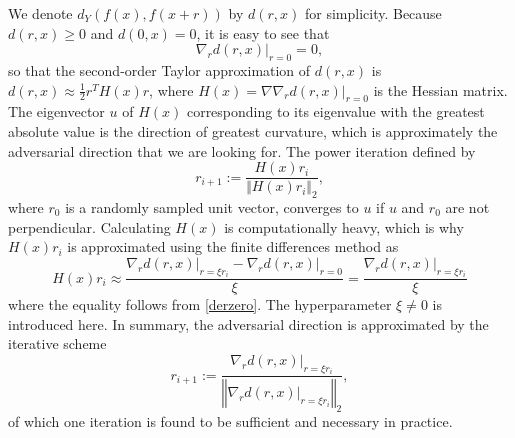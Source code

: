 \documentclass{article}
\begin{document}
We denote $d_Y(f(x),f(x+r))$ by $d(r,x)$ for simplicity. Because $d(r,x)\geq 0$ and $d(0,x)=0$, it is easy to see that
\begin{equation} \label{derzero}
\nabla_rd(r,x)\big\vert_{r=0}=0,
\end{equation}
so that the second-order Taylor approximation of $d(r,x)$ is $d(r,x)\approx\frac{1}{2}r^TH(x)r$, where $H(x)=\nabla\nabla_rd(r,x)\big\vert_{r=0}$ is the Hessian matrix. The eigenvector $u$ of $H(x)$ corresponding to its eigenvalue with the greatest absolute value is the direction of greatest curvature, which is approximately the adversarial direction that we are looking for. The power iteration \citep{Householder1964} defined by
\begin{equation}
r_{i+1}:=\frac{H(x)r_i}{\Vert H(x)r_i\Vert_2},
\end{equation}
where $r_0$ is a randomly sampled unit vector, converges to $u$ if $u$ and $r_0$ are not perpendicular. Calculating $H(x)$ is computationally heavy, which is why $H(x)r_i$ is approximated using the finite differences method as
\begin{equation}
H(x)r_i\approx\frac{\nabla_rd(r,x)\big\vert_{r=\xi r_i}-\nabla_rd(r,x)\big\vert_{r=0}}{\xi}
=\frac{\nabla_rd(r,x)\big\vert_{r=\xi r_i}}{\xi}
\end{equation}
where the equality follows from \eqref{derzero}. The hyperparameter $\xi\neq 0$ is introduced here. In summary, the adversarial direction is approximated by the iterative scheme
\begin{equation}
r_{i+1}:=\frac{\nabla_rd(r,x)\big\vert_{r=\xi r_i}}{\left\Vert \nabla_rd(r,x)\big\vert_{r=\xi r_i}\right\Vert_2},
\end{equation}
of which one iteration is found to be sufficient and necessary in practice.
\end{document}
